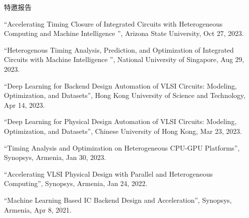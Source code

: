 \begin{rSection}{特邀报告}
\begin{description}[font=\normalfont]
\item[{[7]}]{
``Accelerating Timing Closure of Integrated Circuits with Heterogeneous Computing and Machine Intelligence '', Arizona State University, Oct 27, 2023. 
}

\item[{[6]}]{
``Heterogenous Timing Analysis, Prediction, and Optimization of Integrated Circuits with Machine Intelligence '', National University of Singapore, Aug 29, 2023. 
}

\item[{[5]}]{
``Deep Learning for Backend Design Automation of VLSI Circuits: Modeling, Optimization, and Datasets'', Hong Kong University of Science and Technology, Apr 14, 2023. 
}

\item[{[4]}]{
``Deep Learning for Physical Design Automation of VLSI Circuits: Modeling, Optimization, and Datasets'', Chinese University of Hong Kong, Mar 23, 2023. 
}

\item[{[3]}]{
``Timing Analysis and Optimization on Heterogeneous CPU-GPU Platforms'', Synopsys, Armenia, Jan 30, 2023. 
}

\item[{[2]}]{
``Accelerating VLSI Physical Design with Parallel and Heterogeneous Computing'', Synopsys, Armenia, Jan 24, 2022. 
}

\item[{[1]}]{
``Machine Learning Based IC Backend Design and Acceleration'', Synopsys, Armenia, Apr 8, 2021. 
}

\end{description}

\end{rSection}
